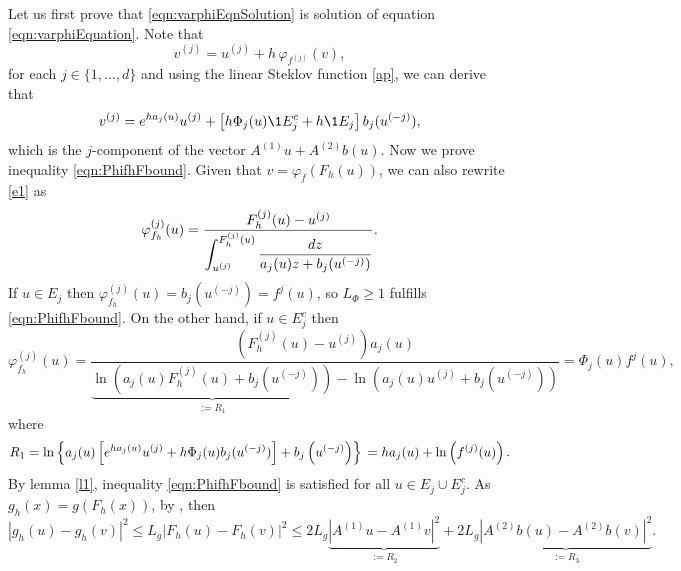 \documentclass[sort&compress, preprint]{elsarticle}
\theoremstyle{definition}
\theoremstyle{plain}%
\theoremstyle{remark}
\begin{document}
\begin{pf}
	Let us first prove that \eqref{eqn:varphiEqnSolution} is solution 
	of equation \eqref{eqn:varphiEquation}.  Note that 
	\begin{equation}\label{e1}
		v^{(j)} = u^{(j)} + h \,\varphi_{f^{(j)}}(v),	
	\end{equation}
	for each $j\in \{1,\dots, d\}$ and using the linear Steklov function \eqref{ap}, 
	 we can derive that
	\begin{equation}
		v^{(j)}= e^{h a_j(u)} u^{(j)} + 
		\left[
			h\Phi_j(u)
			\1{E_j^c}
			+h \1{E_j}
		\right]b_{j}(u^{(-j)}),
	\end{equation}	
	 which is the $j$-component of the vector
	$A^{(1)}u +A^{(2)} b(u)$. Now we prove inequality \eqref{eqn:PhifhFbound}. Given that 
	$v =\varphi_{f}(F_h(u))$, 
	we can also rewrite \eqref{e1} as
	$$
		\varphi_{f_h}^{(j)}(u) = 
			\frac{
				F_h^{(j)}(u)-u^{(j)}
			}%
			{%
				\displaystyle
				\int_{u^{(j)}}^{F_h^{(j)}(u)}
				\frac{dz}{a_j(u)z + b_j(u^{(-j)})}
			}.
	$$
	If $u\in E_j$ then $\varphi_{f_h}^{(j)}(u) = b_j(u^{(-j)}) = f^{j}(u)$,
	so $L_{\Phi}\geq 1$ fulfills  \eqref{eqn:PhifhFbound}.
	On the other hand, if $u\in E_j^c$ then
	\begin{equation}\label{eqn:VarPhiEjc}
		\varphi_{f_h}^{(j)}(u) =
		\frac{
				(F_h^{(j)}(u)-u^{(j)}) a_j(u)
			}
			{
				\underbrace{
				\ln \left(
					a_j(u) F_h^{(j)}(u) + b_j(u^{(-j)})
				\right)
				}_{:=R_1}
				-
				\ln \left(
					a_j(u) u^{(j)} + b_j(u^{(-j)})
				\right)
			}=\Phi_j(u)f^j(u),		
	\end{equation}
	 where
	\begin{equation}\label{eqn:Ter1Simplification}	
		R_1=
			\ln\left\{
				a_j(u)\left[
					e^{ha_j(u)}u^{(j)} +
					h\Phi_j(u) b_j(u^{(-j)})	
				\right]
				+b_j\left(u^{(-j)}\right)
			\right\} \notag \\
		=h a_j(u) + \ln \left( f^{(j)}(u) \right).		
	\end{equation}
	By lemma \ref{l1}, inequality \eqref{eqn:PhifhFbound} is satisfied 
	for all $u\in E_j \cup E_j^c$. 	As $g_h(x)=g\left(F_h(x) \right)$, 
	by , then
	\begin{equation} \label{eqn:gLocalLipschitzArg} 
		|g_h(u)-g_h(v)|^2 \leq
			L_g|F_h(u)- F_h(v)|^2  \leq
			2L_g \underbrace{
				|A^{(1)}u - A^{(1)}v|^2 
			}_{:=R_2} +
			2L_g \underbrace{
				|A^{(2)}b(u) - A^{(2)}b(v) |^2 
			}_{:=R_3}.			
	\end{equation}

\end{pf}
\end{document}
